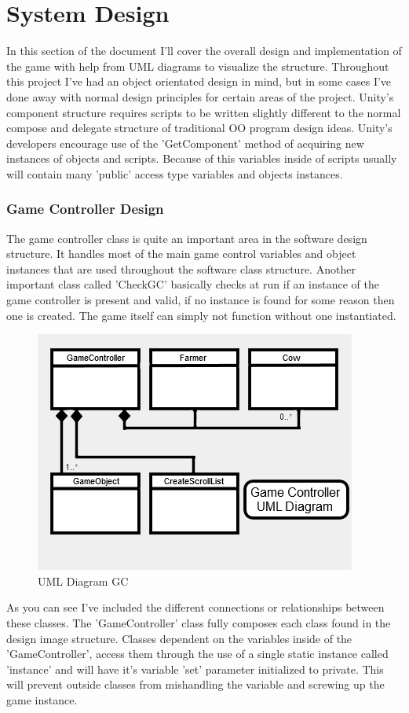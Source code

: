 \chapter{System Design}
In this section of the document I'll cover the overall design and implementation of the game with help from UML diagrams to visualize the structure. Throughout this project I've had an object orientated design in mind, but in some cases I've done away with normal design principles for certain areas of the project. Unity's component structure requires scripts to be written slightly different to the normal compose and delegate structure of traditional OO program design ideas. Unity's developers encourage use of the 'GetComponent' method of acquiring new instances of objects and scripts. Because of this variables inside of scripts usually will contain many 'public' access type variables and objects instances.
\subsection{Game Controller Design}
The game controller class is quite an important area in the software design structure. It handles most of the main game control variables and object instances that are used throughout the software class structure. Another important class called 'CheckGC' basically checks at run if an instance of the game controller is present and valid, if no instance is found for some reason then one is created. The game itself can simply not function without one instantiated.

\begin{figure}[!ht]
	\caption{UML Diagram GC}
	\centering
	\includegraphics{img/gc_uml.png}
\end{figure}

As you can see I've included the different connections or relationships between these classes. The 'GameController' class fully composes each class found in the design image structure. Classes dependent on the variables inside of the 'GameController', access them through the use of a single static instance called 'instance' and will have it's variable 'set' parameter initialized to private. This will prevent outside classes from mishandling the variable and screwing up the game instance.
